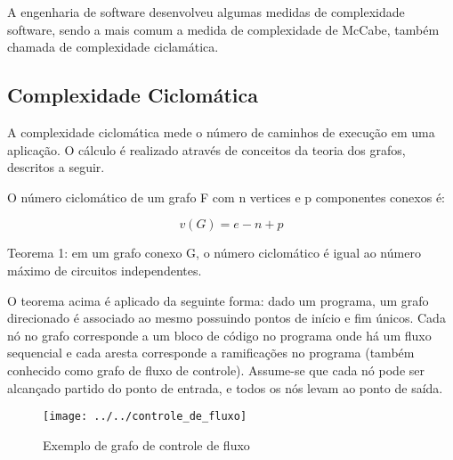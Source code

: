 A engenharia de software desenvolveu algumas medidas de complexidade software, sendo a mais comum a medida de complexidade de McCabe, também chamada de complexidade ciclamática. 

\subsection{ Complexidade Ciclomática }

A complexidade ciclomática mede o número de caminhos de execução em uma aplicação. O cálculo é realizado através de conceitos da teoria dos grafos, descritos a seguir.

O número ciclomático de um grafo F com n vertices e p componentes conexos é:

\[ v(G) = e - n + p \]

Teorema 1: em um grafo conexo G, o número ciclomático é igual ao número máximo de circuitos independentes. 

O teorema acima é aplicado da seguinte forma: dado um programa, um grafo direcionado é associado ao mesmo possuindo pontos de início e fim únicos. Cada nó no grafo corresponde a um bloco de código no programa onde há um fluxo sequencial e cada aresta corresponde a ramificações no programa (também conhecido como grafo de fluxo de  controle). Assume-se que cada nó pode ser alcançado partido do ponto de entrada, e todos os nós levam ao ponto de saída. 
\begin{figure}
	\centering
	\texttt{[image: ../../controle\_de\_fluxo]}
	\caption{Exemplo de grafo de controle de fluxo}
	\label{fig:grafo-de-controle-de-fluxo}
\end{figure}


